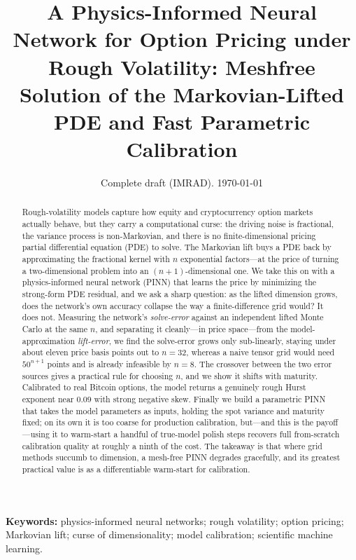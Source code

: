 \documentclass[11pt]{article}
\title{\textbf{A Physics-Informed Neural Network for Option Pricing under Rough
Volatility: Meshfree Solution of the Markovian-Lifted PDE and Fast Parametric
Calibration}}
\author{\todo{Authors / affiliations}}
\date{Complete draft (IMRAD). \today}
\begin{document}
\maketitle

\begin{abstract}
Rough-volatility models capture how equity and cryptocurrency option markets
actually behave, but they carry a computational curse: the driving noise is
fractional, the variance process is non-Markovian, and there is no
finite-dimensional pricing partial differential equation (PDE) to solve. The
Markovian lift buys a PDE back by approximating the fractional kernel with $n$
exponential factors---at the price of turning a two-dimensional problem into an
$(n{+}1)$-dimensional one. We take this on with a physics-informed neural network
(PINN) that learns the price by minimizing the strong-form PDE residual, and we
ask a sharp question: as the lifted dimension grows, does the network's own
accuracy collapse the way a finite-difference grid would? It does not. Measuring
the network's \emph{solve-error} against an independent lifted Monte Carlo at the
same $n$, and separating it cleanly---in price space---from the
model-approximation \emph{lift-error}, we find the solve-error grows only
sub-linearly, staying under about eleven price basis points out to $n{=}32$,
whereas a naive tensor grid would need $50^{n+1}$ points and is already infeasible
by $n{=}8$. The crossover between the two error sources gives a practical rule for
choosing $n$, and we show it shifts with maturity. Calibrated to real Bitcoin
options, the model returns a genuinely rough Hurst exponent near $0.09$ with
strong negative skew. Finally we build a parametric PINN that takes the model
parameters as inputs, holding the spot variance and maturity fixed; on its own it
is too coarse for production calibration, but---and this is the payoff---using it
to warm-start a handful of true-model polish steps recovers full from-scratch
calibration quality at roughly a ninth of the cost. The takeaway is that where
grid methods succumb to dimension, a mesh-free PINN degrades gracefully, and its
greatest practical value is as a differentiable warm-start for calibration.
\end{abstract}

\noindent\textbf{Keywords:} physics-informed neural networks; rough volatility;
option pricing; Markovian lift; curse of dimensionality; model calibration;
scientific machine learning.

\end{document}
